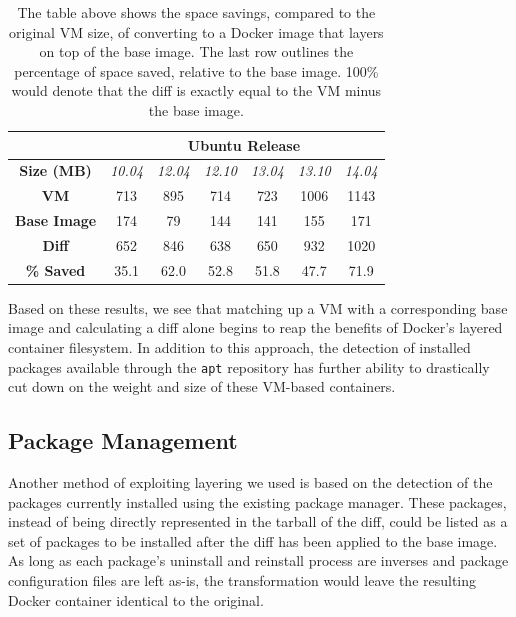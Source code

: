 \documentclass[\myfontsize, letterpaper]{article}
\begin{document}
\begin{table}[h]
\centering
    \begin{tabular}{| c | c | c | c | c | c | c |}
    \hline
& \multicolumn{6}{|c|}{\bfseries Ubuntu Release} \\ \hline
    \bfseries Size (MB) & \itshape 10.04 & \itshape 12.04 & \itshape 12.10 & \itshape 13.04 & \itshape 13.10 & \itshape 14.04 \\ \hline
    \bfseries VM & 713 &  895 & 714 & 723 & 1006 & 1143\\ \hline
    \bfseries Base Image & 174 & 79 & 144 & 141 & 155 & 171  \\ \hline
    \bfseries Diff & 652 & 846 & 638 & 650 & 932 & 1020\\ \hline \hline
    \bfseries \% Saved & 35.1 & 62.0 & 52.8 & 51.8 & 47.7 & 71.9\\
    \hline
    \end{tabular}
\caption{The table above shows the space savings, compared to the original VM size, of converting to a Docker image that layers on top of the base image. The last row outlines the percentage of space saved, relative to the base image. 100\% would denote that the diff is exactly equal to the VM minus the base image.}
\label{table:diff}
\end{table}


Based on these results, we see that matching up a VM with a corresponding base image and calculating a diff alone begins to reap the benefits of Docker's layered container filesystem. In addition to this approach, the detection of installed packages available through the \texttt{apt} repository has further ability to drastically cut down on the weight and size of these VM-based containers.

\subsection{Package Management}

Another method of exploiting layering we used is based on the detection of the packages currently installed using the existing package manager. These packages, instead of being directly represented in the tarball of the diff, could be listed as a set of packages to be installed after the diff has been applied to the base image. As long as each package's uninstall and reinstall process are inverses and package configuration files are left as-is, the transformation would leave the resulting Docker container identical to the original.
\end{document}

